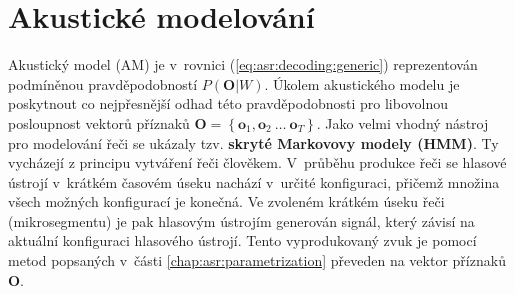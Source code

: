 \section{Akustické modelování}
\label{chap:asr:acoustic}

Akustický model (AM) je v~rovnici (\ref{eq:asr:decoding:generic}) reprezentován podmíněnou pravděpodobností $P(\boldsymbol{O}|W)$. Úkolem akustického modelu je poskytnout co nejpřesnější odhad této pravděpodobnosti pro libovolnou posloupnost vektorů příznaků $\boldsymbol{O} = \left\{\boldsymbol{o}_1, \boldsymbol{o}_2\ \dots\ \boldsymbol{o}_T\right\}$. Jako velmi vhodný nástroj pro modelování řeči se ukázaly tzv. \textbf{skryté Markovovy modely (HMM)}. Ty vycházejí z principu vytváření řeči člověkem. V~průběhu produkce řeči se hlasové ústrojí v~krátkém časovém úseku nachází v~určité konfiguraci, přičemž množina všech možných konfigurací je konečná. Ve zvoleném krátkém úseku řeči (mikrosegmentu) je pak hlasovým ústrojím generován signál, který závisí na aktuální konfiguraci hlasového ústrojí. Tento vyprodukovaný zvuk je pomocí metod popsaných v~části \ref{chap:asr:parametrization} převeden na vektor příznaků $\boldsymbol{O}$.





